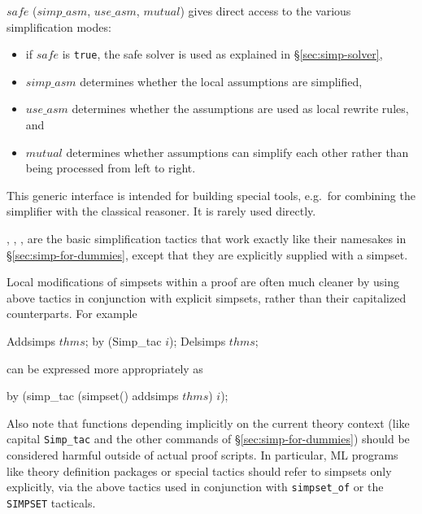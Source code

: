 \begin{ttdescription}
  
\item[\ttindexbold{generic_simp_tac} $safe$ ($simp\_asm$, $use\_asm$, $mutual$)] 
  gives direct access to the various simplification modes: 
  \begin{itemize}
  \item if $safe$ is {\tt true}, the safe solver is used as explained in
  {\S}\ref{sec:simp-solver},  
  \item $simp\_asm$ determines whether the local assumptions are simplified,
  \item $use\_asm$ determines whether the assumptions are used as local rewrite 
   rules, and
  \item $mutual$ determines whether assumptions can simplify each other rather
  than being processed from left to right. 
  \end{itemize}
  This generic interface is intended 
  for building special tools, e.g.\ for combining the simplifier with the 
  classical reasoner. It is rarely used directly.
  
\item[\ttindexbold{simp_tac}, \ttindexbold{asm_simp_tac},
  \ttindexbold{full_simp_tac}, \ttindexbold{asm_full_simp_tac}] are
  the basic simplification tactics that work exactly like their
  namesakes in {\S}\ref{sec:simp-for-dummies}, except that they are
  explicitly supplied with a simpset.
  
\end{ttdescription}

\medskip

Local modifications of simpsets within a proof are often much cleaner
by using above tactics in conjunction with explicit simpsets, rather
than their capitalized counterparts.  For example
\begin{ttbox}
Addsimps \(thms\);
by (Simp_tac \(i\));
Delsimps \(thms\);
\end{ttbox}
can be expressed more appropriately as
\begin{ttbox}
by (simp_tac (simpset() addsimps \(thms\)) \(i\));
\end{ttbox}

\medskip

Also note that functions depending implicitly on the current theory
context (like capital \texttt{Simp_tac} and the other commands of
{\S}\ref{sec:simp-for-dummies}) should be considered harmful outside of
actual proof scripts.  In particular, ML programs like theory
definition packages or special tactics should refer to simpsets only
explicitly, via the above tactics used in conjunction with
\texttt{simpset_of} or the \texttt{SIMPSET} tacticals.


